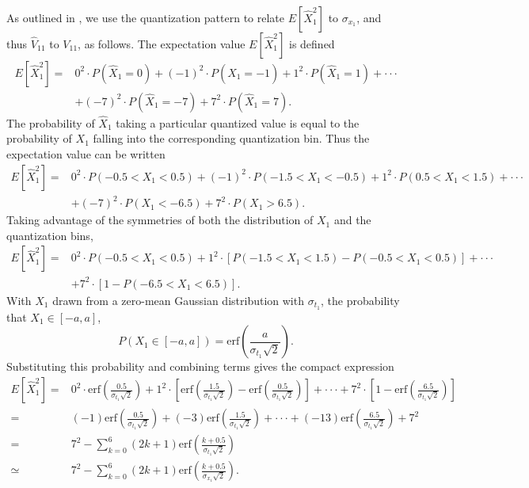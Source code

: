 \documentclass[11pt]{article}
\begin{document}
\paragraph{}
As outlined in \cite{VV}, we use the quantization pattern to relate $E[\hat X_1^2]$ to $ \sigma_{x_1}$, and thus $\hat V_{11}$ to $V_{11}$, as follows. The expectation value $E[\hat X_1^2]$ is defined
\begin{equation}
\begin{split}
E[\hat X_1^2]=&0^2\cdot P(\hat X_1 = 0) +(-1)^2\cdot P(\hat X_1 = -1)+1^2\cdot P(\hat X_1 = 1)+\cdot\cdot\cdot\\
&+(-7)^2\cdot P(\hat X_1 = -7)+7^2\cdot P(\hat X_1 = 7).
\end{split}
\end{equation}
The probability of $\hat X_1$ taking a particular quantized value is equal to the probability of $X_1$ falling into the corresponding quantization bin. Thus the expectation value can be written
\begin{equation}
\begin{split}
E[\hat X_1^2]=&0^2\cdot P(-0.5<X_1<0.5) +(-1)^2\cdot P(-1.5<X_1<-0.5)+1^2\cdot P(0.5<X_1<1.5)+\cdot\cdot\cdot\\
&+(-7)^2\cdot P(X_1<-6.5)+7^2\cdot P(X_1>6.5).
\end{split}
\end{equation}
Taking advantage of the symmetries of both the distribution of $X_1$ and the quantization bins, 
\begin{equation}
\begin{split}
E[\hat X_1^2]=&0^2\cdot P(-0.5<X_1<0.5)+1^2\cdot[P(-1.5<X_1<1.5)-P(-0.5<X_1<0.5)]+\cdot\cdot\cdot\\
&+7^2\cdot[1-P(-6.5<X_1<6.5)].
\end{split}
\end{equation}
With $X_1$ drawn from a zero-mean Gaussian distribution with $\sigma_{t_1}$, the probability that $X_1\in[-a,a]$,
\begin{equation}
P(X_1\in[-a,a])=\textrm{erf}\left(\frac{a}{\sigma_{t_1}\sqrt{2}}\right).
\end{equation}
Substituting this probability and combining terms gives the compact expression
\begin{align}
E[\hat X_1^2]=&0^2\cdot\textrm{erf}\left(\frac{0.5}{\sigma_{t_1}\sqrt{2}}\right)+1^2\cdot\left[\textrm{erf}\left(\frac{1.5}{\sigma_{t_1}\sqrt{2}}\right)-\textrm{erf}\left(\frac{0.5}{\sigma_{t_1}\sqrt{2}}\right)\right]+\cdot\cdot\cdot+7^2\cdot\left[1-\textrm{erf}\left(\frac{6.5}{\sigma_{t_1}\sqrt{2}}\right)\right]\nonumber\\
=&(-1)\textrm{erf}\left(\frac{0.5}{\sigma_{t_1}\sqrt{2}}\right)+(-3)\textrm{erf}\left(\frac{1.5}{\sigma_{t_1}\sqrt{2}}\right)+\cdot\cdot\cdot+(-13)\textrm{erf}\left(\frac{6.5}{\sigma_{t_1}\sqrt{2}}\right)+7^2\nonumber\\
=&7^2-\sum_{k=0}^6(2k+1)\textrm{erf}\left(\frac{k+0.5}{\sigma_{t_1}\sqrt{2}}\right)\nonumber\\
\simeq&7^2-\sum_{k=0}^6(2k+1)\textrm{erf}\left(\frac{k+0.5}{\sigma_{x_1}\sqrt{2}}\right).
\end{align}
\end{document}
